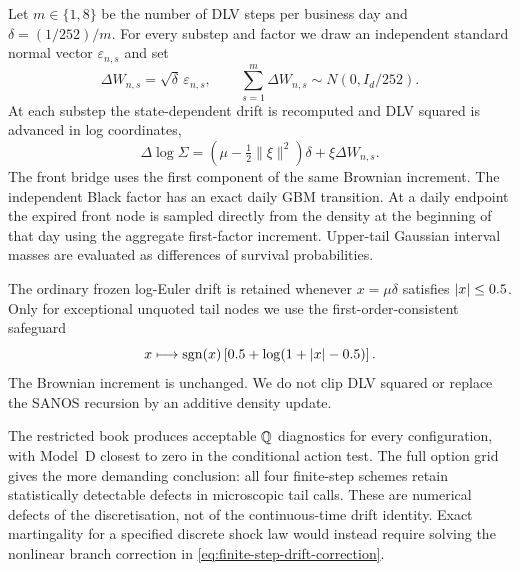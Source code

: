{Let $m\in\{1,8\}$ be the number of DLV steps per business day and
$\delta=(1/252)/m$.  For every substep and factor we draw an independent
standard normal vector $\varepsilon_{n,s}$ and set
\begin{equation}\label{eq:numerics-brownian-substeps}
  \Delta W_{n,s}=\sqrt{\delta}\,\varepsilon_{n,s},
  \qquad
  \sum_{s=1}^{m}\Delta W_{n,s}\sim N(0,I_d/252).
\end{equation}
At each substep the state-dependent drift is recomputed and DLV squared is
advanced in log coordinates,
\begin{equation}\label{eq:numerics-log-step}
  \Delta\log\Sigma
  =\left(\mu-\tfrac12\lVert\xi\rVert^2\right)\delta
   +\xi\Delta W_{n,s}.
\end{equation}
The front bridge uses the first component of the same Brownian increment.  The
independent Black factor has an exact daily GBM transition.  At a daily
endpoint the expired front node is sampled directly from the density at the
beginning of that day using the aggregate first-factor increment.  Upper-tail
Gaussian interval masses are evaluated as differences of survival
probabilities.

The ordinary frozen log-Euler drift is retained whenever
$x=\mu\delta$ satisfies $\lvert x\rvert\leq0.5$.  Only for exceptional unquoted tail
nodes we use the first-order-consistent safeguard
\begin{equation}\label{eq:numerics-tail-safeguard}
  x\longmapsto
  \operatorname{sgn}(x)
  \left[0.5+\log(1+\lvert x\rvert-0.5)\right].
\end{equation}
The Brownian increment is unchanged.  We do not clip DLV squared or replace
the SANOS recursion by an additive density update.

The restricted book produces acceptable $\mathbb Q$ diagnostics for every
configuration, with Model~D closest to zero in the conditional action test.
The full option grid gives the more demanding conclusion: all four finite-step
schemes retain statistically detectable defects in microscopic tail calls.
These are numerical defects of the discretisation, not of the continuous-time
drift identity.  Exact martingality for a specified discrete shock law would
instead require solving the nonlinear branch correction in
\eqref{eq:finite-step-drift-correction}.
}
